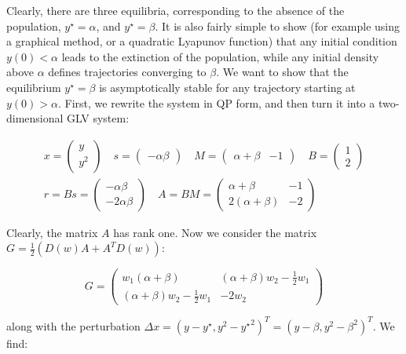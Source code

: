\documentclass{article}
\begin{document}
Clearly, there are three equilibria, corresponding to the absence of the
population, \(y^\star = \alpha\), and \(y^\star = \beta\). It is also
fairly simple to show (for example using a graphical method, or a
quadratic Lyapunov function) that any initial condition
\(y(0) < \alpha\) leads to the extinction of the population, while any
initial density above \(\alpha\) defines trajectories converging to
\(\beta\). We want to show that the equilibrium \(y^\star = \beta\) is
asymptotically stable for any trajectory starting at \(y(0) > \alpha\).
First, we rewrite the system in QP form, and then turn it into a
two-dimensional GLV system:

\begin{equation}
\begin{aligned}
x = \begin{pmatrix}
y\\
y^2
\end{pmatrix}
\quad
s = \begin{pmatrix}
- \alpha \beta
\end{pmatrix}
\quad
M = \begin{pmatrix}
\alpha + \beta & -1
\end{pmatrix}
\quad
B = \begin{pmatrix}
1 \\
2
\end{pmatrix}
\\
r = Bs= \begin{pmatrix}
- \alpha \beta\\
- 2 \alpha \beta
\end{pmatrix}
\quad 
A = BM = \begin{pmatrix}
\alpha +  \beta & -1\\
2 (\alpha + \beta) & -2
\end{pmatrix}
\end{aligned}
\end{equation}

Clearly, the matrix \(A\) has rank one. Now we consider the matrix
\(G = \frac{1}{2} (D(w)A + A^T D(w))\):

\begin{equation}
G = \begin{pmatrix}
w_1 (\alpha + \beta) & (\alpha + \beta) w_2 - \frac{1}{2} w_1\\
(\alpha + \beta) w_2 - \frac{1}{2} w_1 & - 2 w_2
\end{pmatrix}
\end{equation}

along with the perturbation
\(\Delta x = (y - y^\star, y^2 - {y^\star}^2)^T = (y - \beta, y^2 - \beta^2)^T\).
We find:
\end{document}
